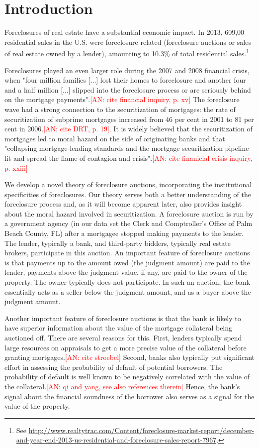 \documentclass[11pt,twopage]{article}
\newcommand{\AN}[1]{\textcolor{red}{[AN: #1]}}
\begin{document}
\section{Introduction}

Foreclosures of real estate have a substantial economic impact. In
2013, 609,00 residential sales in the U.S. were foreclosure related
(foreclosure auctions or sales of real estate owned by a lender),
amounting to 10.3\% of total residential sales.\footnote{See
  \url{http://www.realtytrac.com/Content/foreclosure-market-report/december-and-year-end-2013-us-residential-and-foreclosure-sales-report-7967}.}

Foreclosures played an even larger role during the 2007 and 2008
financial crisis, when "four million families [...] lost their homes
to foreclosure and another four and a half million [...] slipped into
the foreclosure process or are seriously behind on the mortgage
payments".\AN{cite financial inquiry, p. xv} The foreclosure wave had
a strong connection to the securitization of mortgages: the rate of
securitization of subprime mortgages increased from 46 per cent in
2001 to 81 per cent in 2006.\AN{cite DRT, p. 19}. It is widely
believed that the securitization of mortgages led to moral hazard on
the side of originating banks and that "collapsing mortgage-lending
standards and the mortgage securitization pipeline lit and spread the
flame of contagion and crisis".\AN{cite finanicial crisis inquiry,
  p. xxiii}

We develop a novel theory of foreclosure auctions, incorporating the
institutional specificities of foreclosures. Our theory serves both a
better understanding of the foreclosure process and, as it will become
apparent later, also provides insight about the moral hazard involved
in securitization. A foreclosure auction is run by a government agency
(in our data set the Clerk and Comptroller's Office of Palm Beach
County, FL) after a mortgagee stopped making payments to the
lender. The lender, typically a bank, and third-party bidders,
typically real estate brokers, participate in this auction. An
important feature of foreclosure auctions is that payments up to the
amount owed (the judgment amount) are paid to the lender, payments
above the judgment value, if any, are paid to the owner of the
property. The owner typically does not participate. In such an
auction, the bank essentially acts as a seller below the judgment
amount, and as a buyer above the judgment amount.

Another important feature of foreclosure auctions is that the bank is
likely to have superior information about the value of the mortgage
collateral being auctioned off. There are several reasons for
this. First, lenders typically spend large resources on appraisals to
get a more precise value of the collateral before granting
mortgages.\AN{cite stroebel} Second, banks also typically put
significant effort in assessing the probability of default of
potential borrowers. The probability of default is well known to be
negatively correlated with the value of the collateral.\AN{qi and
  yang, see also references therein} Hence, the bank's signal about
the financial soundness of the borrower also serves as a signal for
the value of the property.
\end{document}
